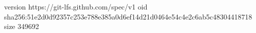 version https://git-lfs.github.com/spec/v1
oid sha256:51e2d0d92357c253e788e385a0d6ef14d21d0464e54c4e2c6ab5c48304418718
size 349692
